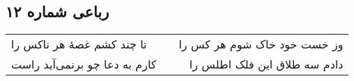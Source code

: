 \begin{center}
\section*{رباعی شماره ۱۲}
\label{sec:sh012}
\begin{longtable}{l p{0.5cm} r}
تا چند کشم غصهٔ هر ناکس را
&&
وز خست خود خاک شوم هر کس را
\\
کارم به دعا چو برنمی‌آید راست
&&
دادم سه طلاق این فلک اطلس را
\\
\end{longtable}
\end{center}
